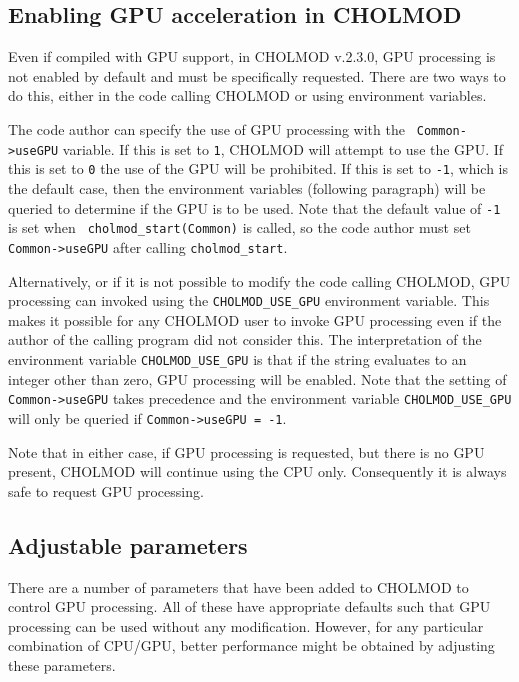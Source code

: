 \documentclass[11pt]{article}
\begin{document}
\subsection{Enabling GPU acceleration in CHOLMOD}

Even if compiled with GPU support, in CHOLMOD v.2.3.0, GPU processing is not
enabled by default and must be specifically requested.  There are two ways to
do this, either in the code calling CHOLMOD or using environment variables.

The code author can specify the use of GPU processing with the {\tt
Common->useGPU} variable.  If this is set to {\tt 1}, CHOLMOD will attempt to
use the GPU.  If this is set to {\tt 0} the use of the GPU will be prohibited.
If this is set to {\tt -1}, which is the default case, then the environment
variables (following paragraph) will be queried to determine if the GPU is to
be used.  Note that the default value of {\tt -1} is set when {\tt
cholmod\_start(Common)} is called, so the code author must set {\tt
Common->useGPU} after calling {\tt cholmod\_start}.

Alternatively, or if it is not possible to modify the code calling CHOLMOD, GPU
processing can invoked using the {\tt CHOLMOD\_USE\_GPU} environment variable.
This makes it possible for any CHOLMOD user to invoke GPU processing even if
the author of the calling program did not consider this.  The interpretation of
the environment variable {\tt CHOLMOD\_USE\_GPU} is that if the string
evaluates to an integer other than zero, GPU processing will be enabled.  Note
that the setting of {\tt Common->useGPU} takes precedence and the environment
variable {\tt CHOLMOD\_USE\_GPU} will only be queried if {\tt Common->useGPU =
-1}.

Note that in either case, if GPU processing is requested, but there is no GPU
present, CHOLMOD will continue using the CPU only.  Consequently it is always
safe to request GPU processing.

\subsection{Adjustable parameters}

There are a number of parameters that have been added to CHOLMOD to control GPU
processing.  All of these have appropriate defaults such that GPU processing
can be used without any modification.  However, for any particular combination
of CPU/GPU, better performance might be obtained by adjusting these parameters.
\end{document}
